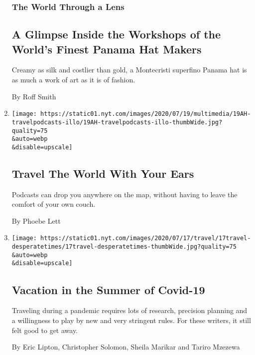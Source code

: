 \begin{enumerate}
{  \subsubsection{The World Through a
  Lens}\label{the-world-through-a-lens-1}}

  \hypertarget{a-glimpse-inside-the-workshops-of-the-worlds-finest-panama-hat-makers}{%
  \subsection{A Glimpse Inside the Workshops of the World's Finest
  Panama Hat
  Makers}\label{a-glimpse-inside-the-workshops-of-the-worlds-finest-panama-hat-makers}}

  Creamy as silk and costlier than gold, a Montecristi superfino Panama
  hat is as much a work of art as it is of fashion.

  By Roff Smith
\item
  \href{/2020/07/18/at-home/coronavirus-travel-podcasts.html}{}

  \texttt{[image: https://static01.nyt.com/images/2020/07/19/multimedia/19AH-travelpodcasts-illo/19AH-travelpodcasts-illo-thumbWide.jpg?quality=75\\\&auto=webp\\\&disable=upscale]}

  \hypertarget{travel-the-world-with-your-ears}{%
  \subsection{Travel The World With Your
  Ears}\label{travel-the-world-with-your-ears}}

  Podcasts can drop you anywhere on the map, without having to leave the
  comfort of your own couch.

  By Phoebe Lett
\item
  \href{/2020/07/16/travel/virus-vacation.html}{}

  \texttt{[image: https://static01.nyt.com/images/2020/07/17/travel/17travel-desperatetimes/17travel-desperatetimes-thumbWide.jpg?quality=75\\\&auto=webp\\\&disable=upscale]}

  \hypertarget{vacation-in-the-summer-of-covid-19}{%
  \subsection{Vacation in the Summer of
  Covid-19}\label{vacation-in-the-summer-of-covid-19}}

  Traveling during a pandemic requires lots of research, precision
  planning and a willingness to play by new and very stringent rules.
  For these writers, it still felt good to get away.

  By Eric Lipton, Christopher Solomon, Sheila Marikar and Tariro Mzezewa
\end{enumerate}

